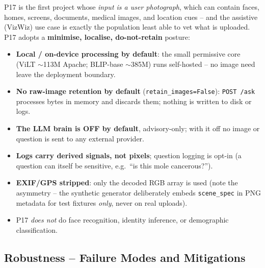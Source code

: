 \documentclass[12pt,a4paper]{article}
\begin{document}
P17 is the first project whose \emph{input is a user photograph}, which can contain faces, homes, screens, documents, medical images, and location cues -- and the assistive (VizWiz) use case is exactly the population least able to vet what is uploaded. P17 adopts a \textbf{minimise, localise, do-not-retain} posture:
\begin{itemize}\setlength\itemsep{0.15em}
  \item \textbf{Local / on-device processing by default}: the small permissive core (ViLT $\sim$113M Apache; BLIP-base $\sim$385M) runs self-hosted -- no image need leave the deployment boundary.
  \item \textbf{No raw-image retention by default} (\texttt{retain\_images=False}): \texttt{POST /ask} processes bytes in memory and discards them; nothing is written to disk or logs.
  \item \textbf{The LLM brain is OFF by default}, advisory-only; with it off no image or question is sent to any external provider.
  \item \textbf{Logs carry derived signals, not pixels}; question logging is opt-in (a question can itself be sensitive, e.g.\ ``is this mole cancerous?'').
  \item \textbf{EXIF/GPS stripped}: only the decoded RGB array is used (note the asymmetry -- the synthetic generator deliberately embeds \texttt{scene\_spec} in PNG metadata for test fixtures \emph{only}, never on real uploads).
  \item P17 \emph{does not} do face recognition, identity inference, or demographic classification.
\end{itemize}

\subsection{Robustness -- Failure Modes and Mitigations}
\end{document}
